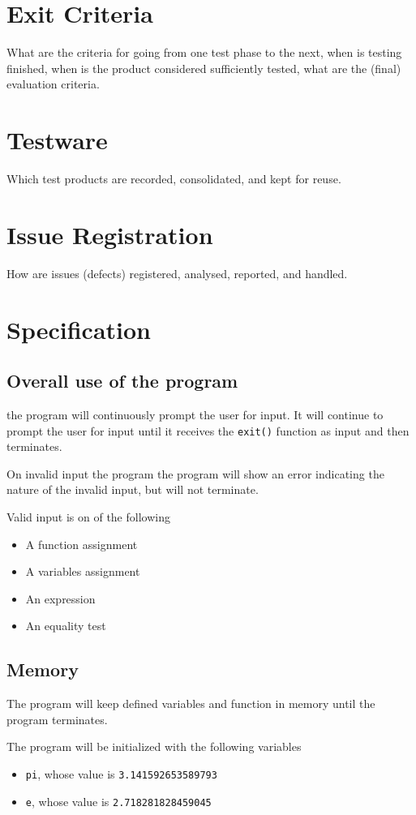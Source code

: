 \documentclass[11pt,a4paper]{article}
\begin{document}
\section{Exit Criteria}
What are the criteria for going from one test phase to the next, when is testing finished,
when is the product considered sufficiently tested, what are the (final) evaluation criteria.
\section{Testware}
Which test products are recorded, consolidated, and kept for reuse.
\section{Issue Registration}
How are issues (defects) registered, analysed, reported, and handled.

\appendix
\section{Specification} \label{app:specification}
\subsection{Overall use of the program}
the program will continuously prompt the user for input. It will
continue to prompt the user for input until it receives the
\texttt{exit()} function as input and then terminates.

On invalid input the program the program will show an error
indicating the nature of the invalid input, but will not terminate.

Valid input is on of the following
\begin{itemize}
\item A function assignment
\item A variables assignment
\item An expression
\item An equality test
\end{itemize}
\subsection{Memory}
The program will keep defined variables and function in memory
until the program terminates.


The program will be initialized with the following variables
\begin{itemize}
\item \texttt{pi}, whose value is \texttt{3.141592653589793}
\item \texttt{e}, whose value is \texttt{2.718281828459045}
\end{itemize}
\end{document}
